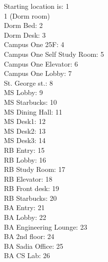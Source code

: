 \documentclass[11pt]{article}
\begin{document}
Starting location is: 1             \\
1 (Dorm room)                       \\  
Dorm Bed: 2                           \\
Dorm Desk: 3                          \\
Campus One 25F: 4                           \\
Campus One Self Study Room: 5               \\
Campus One Elevator: 6                      \\
Campus One Lobby: 7                         \\
St. George st.: 8                         \\
MS Lobby: 9                         \\
MS Starbucks: 10                    \\
MS Dining Hall: 11                  \\
MS Desk1: 12                        \\
MS Desk2: 13                        \\
MS Desk3: 14                        \\
RB Entry: 15                        \\
RB Lobby: 16                        \\
RB Study Room: 17                   \\
RB Elevator: 18                     \\
RB Front desk: 19              \\
RB Starbucks: 20                    \\
BA Entry: 21                        \\
BA Lobby: 22                        \\
BA Engineering Lounge: 23              \\
BA 2nd floor: 24                     \\
BA Sadia Office: 25                       \\
BA CS Lab: 26                       \\
\end{document}
